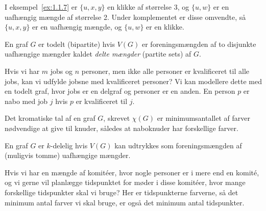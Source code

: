 I eksempel~\ref{ex:1.1.7} er $\{u,x,y\}$ en klikke af størrelse 3, og $\{u,w\}$ er en uafhængig mængde af størrelse 2. Under komplementet er disse omvendte, så $\{u,x,y\}$ er en uafhængig mængde, og $\{u,w\}$ er en klikke.

\begin{definition}
En graf $G$ er todelt (bipartite) hvis $V(G)$ er foreningsmængden af to disjunkte uafhængige mængder kaldet \textit{delte mængder} (partite sets) af $G$.
\end{definition}

\begin{example}
Hvis vi har $m$ jobs og $n$ personer, men ikke alle personer er kvalificeret til alle jobs, kan vi udfylde jobsne med kvalificeret personer? Vi kan modellere dette med en todelt graf, hvor jobs er en delgraf og personer er en anden. En person $p$ er nabo med job $j$ hvis $p$ er kvalificeret til $j$.
\begin{center}
\end{center}
\end{example}

\begin{definition}
Det kromatiske tal af en graf $G$, skrevet $\chi(G)$ er minimumsantallet af farver nødvendige at give til knuder, således at naboknuder har forskellige farver.
\end{definition}

\begin{definition}[$k$-delelighed]
En graf $G$ er $k$-delelig hvis $V(G)$ kan udtrykkes som foreningsmængden af (muligvis tomme) uafhængige mængder.
\end{definition}

\begin{example}
Hvis vi har en mængde af komitéer, hvor nogle personer er i mere end en komité, og vi gerne vil planlægge tidspunktet for møder i disse komitéer, hvor mange forskellige tidspunkter skal vi bruge? Her er tidspunkterne farverne, så det minimum antal farver vi skal bruge, er også det minimum antal tidspunkter.
\end{example}

